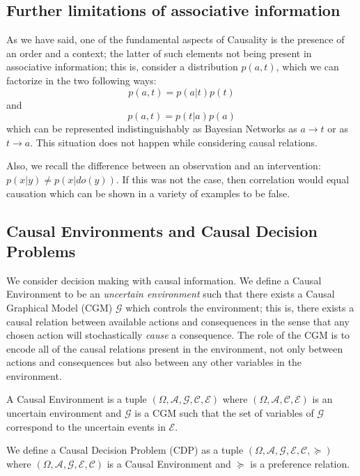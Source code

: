 \documentclass{svjour3}                     %
\begin{document}
\subsection{Further limitations of associative information}
As we have said, one of the fundamental aspects of Causality is the presence of an order and a context; the latter of such elements not being present in associative information; this is, consider a distribution $p(a,t)$, which we can factorize in the two following ways:
\begin{equation}
    p(a,t)=p(a|t)p(t)
\end{equation}
and
\begin{equation}
    p(a,t)=p(t|a)p(a)
\end{equation}
which can be represented indistinguishably as Bayesian Networks as $a \to t$ or as $t \to a$. This situation does not happen while considering causal relations.

Also, we recall the difference between an observation and an intervention: $p(x|y) \neq p(x | do(y))$. If this was not the case, then correlation would equal causation which can be shown in a variety of examples to be false.
\subsection{Causal Environments and Causal Decision Problems}{\label{causal_problems}}
We consider decision making with causal information. We define a Causal Environment to be an \textit{uncertain environment} such that there exists a Causal Graphical Model (CGM) $\mathcal{G}$ \citep{koller2009probabilistic} which controls the environment; this is, there exists a causal relation between available actions and consequences in the sense that any chosen action will stochastically \textit{cause} a consequence. The role of the CGM is to encode all of the causal relations present in the environment, not only between actions and consequences but also between any other variables in the environment. 
\begin{definition}
A Causal Environment is a tuple $(\Omega, \mathcal{A},\mathcal{G},\mathcal{C},\mathcal{E})$ where $(\Omega, \mathcal{A},\mathcal{C},\mathcal{E})$ is an uncertain environment and $\mathcal{G}$ is a CGM such that the set of variables of $\mathcal{G}$ correspond to the uncertain events in $\mathcal{E}$.
\end{definition}
\begin{definition}
We define a Causal Decision Problem (CDP) as a tuple $(\Omega, \mathcal{A}, \mathcal{G},\mathcal{E},\mathcal{C},\succeq)$ where $(\Omega, \mathcal{A}, \mathcal{G},\mathcal{E},\mathcal{C})$ is a Causal Environment and $\succeq$ is a preference relation. 
\end{definition}
\end{document}
